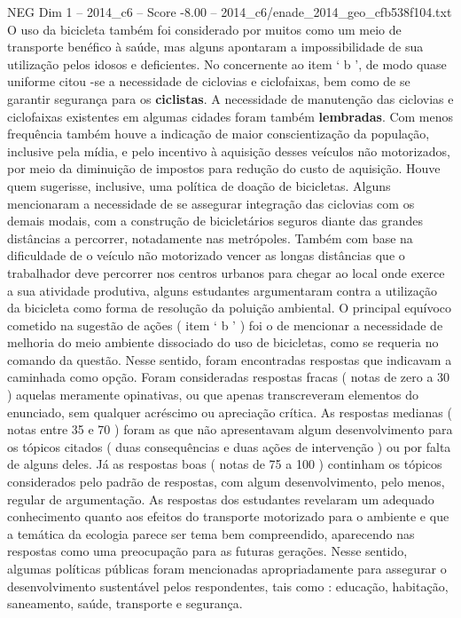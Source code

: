 \begin{textsample}{NEG Dim 1 – 2014\_c6 – Score -8.00 – 2014\_c6/enade\_2014\_geo\_cfb538f104.txt}
O uso da bicicleta também foi considerado por muitos como um meio de transporte benéfico à saúde, mas alguns apontaram a impossibilidade de sua utilização pelos idosos e deficientes.
No concernente ao item ‘ b ’, de modo quase uniforme citou -se a necessidade de ciclovias e ciclofaixas, bem como de se garantir segurança para os \textbf{ciclistas}.
A necessidade de manutenção das ciclovias e ciclofaixas existentes em algumas cidades foram também \textbf{lembradas}.
Com menos frequência também houve a indicação de maior conscientização da população, inclusive pela mídia, e pelo incentivo à aquisição desses veículos não motorizados, por meio da diminuição de impostos para redução do custo de aquisição.
Houve quem sugerisse, inclusive, uma política de doação de bicicletas.
Alguns mencionaram a necessidade de se assegurar integração das ciclovias com os demais modais, com a construção de bicicletários seguros diante das grandes distâncias a percorrer, notadamente nas metrópoles.
Também com base na dificuldade de o veículo não motorizado vencer as longas distâncias que o trabalhador deve percorrer nos centros urbanos para chegar ao local onde exerce a sua atividade produtiva, alguns estudantes argumentaram contra a utilização da bicicleta como forma de resolução da poluição ambiental.
O principal equívoco cometido na sugestão de ações ( item ‘ b ’ ) foi o de mencionar a necessidade de melhoria do meio ambiente dissociado do uso de bicicletas, como se requeria no comando da questão.
Nesse sentido, foram encontradas respostas que indicavam a caminhada como opção.
Foram consideradas respostas fracas ( notas de zero a 30 ) aquelas meramente opinativas, ou que apenas transcreveram elementos do enunciado, sem qualquer acréscimo ou apreciação crítica.
As respostas medianas ( notas entre 35 e 70 ) foram as que não apresentavam algum desenvolvimento para os tópicos citados ( duas consequências e duas ações de intervenção ) ou por falta de alguns deles.
Já as respostas boas ( notas de 75 a 100 ) continham os tópicos considerados pelo padrão de respostas, com algum desenvolvimento, pelo menos, regular de argumentação.
As respostas dos estudantes revelaram um adequado conhecimento quanto aos efeitos do transporte motorizado para o ambiente e que a temática da ecologia parece ser tema bem compreendido, aparecendo nas respostas como uma preocupação para as futuras gerações.
Nesse sentido, algumas políticas públicas foram mencionadas apropriadamente para assegurar o desenvolvimento sustentável pelos respondentes, tais como : educação, habitação, saneamento, saúde, transporte e segurança.

\end{textsample}
